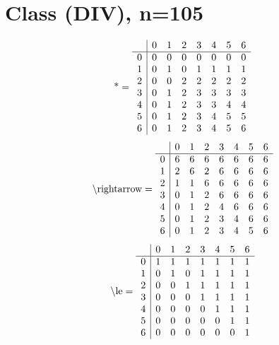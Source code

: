 \documentclass[11pt]{article}
\begin{document}
\section{Class (DIV), n=105}
\[\text{*} = 
\begin{array}{r | r r r r r r r}
 & 0 & 1 & 2 & 3 & 4 & 5 & 6 \\ \hline
0 & 0 & 0 & 0 & 0 & 0 & 0 & 0 \\
1 & 0 & 1 & 0 & 1 & 1 & 1 & 1 \\
2 & 0 & 0 & 2 & 2 & 2 & 2 & 2 \\
3 & 0 & 1 & 2 & 3 & 3 & 3 & 3 \\
4 & 0 & 1 & 2 & 3 & 3 & 4 & 4 \\
5 & 0 & 1 & 2 & 3 & 4 & 5 & 5 \\
6 & 0 & 1 & 2 & 3 & 4 & 5 & 6 \\
\end{array}
\]
\[\text{\textbackslash rightarrow} = 
\begin{array}{r | r r r r r r r}
 & 0 & 1 & 2 & 3 & 4 & 5 & 6 \\ \hline
0 & 6 & 6 & 6 & 6 & 6 & 6 & 6 \\
1 & 2 & 6 & 2 & 6 & 6 & 6 & 6 \\
2 & 1 & 1 & 6 & 6 & 6 & 6 & 6 \\
3 & 0 & 1 & 2 & 6 & 6 & 6 & 6 \\
4 & 0 & 1 & 2 & 4 & 6 & 6 & 6 \\
5 & 0 & 1 & 2 & 3 & 4 & 6 & 6 \\
6 & 0 & 1 & 2 & 3 & 4 & 5 & 6 \\
\end{array}
\]
\[\text{\textbackslash le} = 
\begin{array}{r | r r r r r r r}
 & 0 & 1 & 2 & 3 & 4 & 5 & 6 \\ \hline
0 & 1 & 1 & 1 & 1 & 1 & 1 & 1 \\
1 & 0 & 1 & 0 & 1 & 1 & 1 & 1 \\
2 & 0 & 0 & 1 & 1 & 1 & 1 & 1 \\
3 & 0 & 0 & 0 & 1 & 1 & 1 & 1 \\
4 & 0 & 0 & 0 & 0 & 1 & 1 & 1 \\
5 & 0 & 0 & 0 & 0 & 0 & 1 & 1 \\
6 & 0 & 0 & 0 & 0 & 0 & 0 & 1 \\
\end{array}
\]
\end{document}
